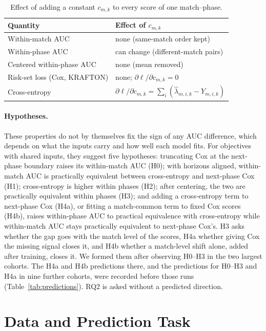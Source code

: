 \documentclass[sigconf,anonymous,nonacm]{acmart}
\begin{document}
\begin{table}[t]
\centering\footnotesize
\caption{Effect of adding a constant $c_{m,k}$ to every score of one match--phase.}
\label{tab:account}
\setlength{\tabcolsep}{3pt}
\begin{tabular}{ll}
\toprule
Quantity & Effect of $c_{m,k}$ \\
\midrule
Within-match AUC & none (same-match order kept) \\
Within-phase AUC & can change (different-match pairs) \\
Centered within-phase AUC & none (mean removed) \\
Risk-set loss (Cox, KRAFTON) & none; $\partial\ell/\partial c_{m,k}=0$ \\
Cross-entropy & $\partial\ell/\partial c_{m,k}=\sum_{i}(\hat\lambda_{m,i,k}-Y_{m,i,k})$ \\
\bottomrule
\end{tabular}
\end{table}

\paragraph{Hypotheses.}
These properties do not by themselves fix the sign of any AUC difference, which depends on what the inputs carry and how well each model fits. For objectives with shared inputs, they suggest five hypotheses: truncating Cox at the next-phase boundary raises its within-match AUC (H0); with horizons aligned, within-match AUC is practically equivalent between cross-entropy and next-phase Cox (H1); cross-entropy is higher within phases (H2); after centering, the two are practically equivalent within phases (H3); and adding a cross-entropy term to next-phase Cox (H4a), or fitting a match-common term to fixed Cox scores (H4b), raises within-phase AUC to practical equivalence with cross-entropy while within-match AUC stays practically equivalent to next-phase Cox's. H3 asks whether the gap goes with the match level of the scores, H4a whether giving Cox the missing signal closes it, and H4b whether a match-level shift alone, added after training, closes it. We formed them after observing H0--H3 in the two largest cohorts. The H4a and H4b predictions there, and the predictions for H0--H3 and H4a in nine further cohorts, were recorded before those runs (Table~\ref{tab:predictions}). RQ2 is asked without a predicted direction.

\section{Data and Prediction Task}
\label{sec:method}
\end{document}
